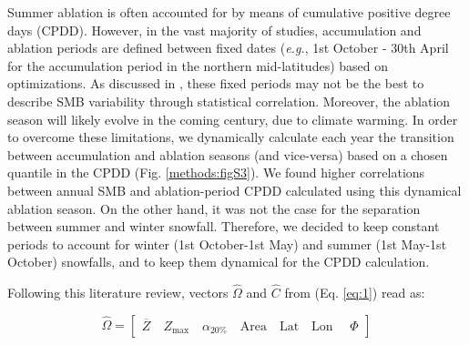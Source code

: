 Summer ablation is often accounted for by means of cumulative positive degree days (CPDD). However, in the vast majority of studies, accumulation and ablation periods are defined between fixed dates (\textit{e.g.}, 1st October - 30th April for the accumulation period in the northern mid-latitudes) based on optimizations. As discussed in \citet{zekollari_statistical_2018}, these fixed periods may not be the best to describe SMB variability through statistical correlation. Moreover, the ablation season will likely evolve in the coming century, due to climate warming. In order to overcome these limitations, we dynamically calculate each year the transition between accumulation and ablation seasons (and vice-versa) based on a chosen quantile in the CPDD (Fig. \ref{methods:figS3}). We found higher correlations between annual SMB and ablation-period CPDD calculated using this dynamical ablation season. On the other hand, it was not the case for the separation between summer and winter snowfall. Therefore, we decided to keep constant periods to account for winter (1st October-1st May) and summer (1st May-1st October) snowfalls, and to keep them dynamical for the CPDD calculation.

Following this literature review, vectors $\hat{\Omega}$ and $\hat{C}$ from (Eq. \ref{eq:1}) read as:

\begin{equation} \label{eq:2}
\hat{\Omega}=\left[\begin{array}{lllllll}{\overline{Z}   \quad Z_{\max }   \quad \alpha_{20\%}  \quad \text {Area}  \quad \text{Lat}  \quad \text{Lon }  \quad \Phi }\end{array}\right]
\end{equation}

